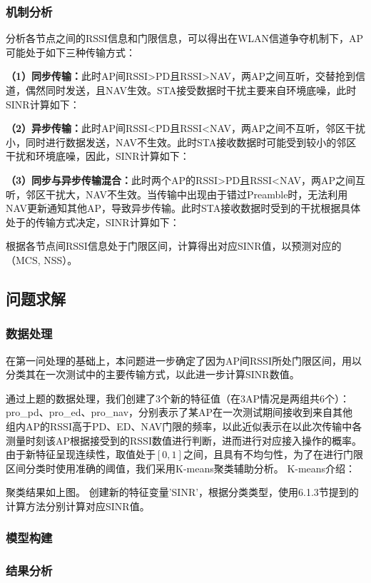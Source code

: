 \documentclass[bwprint]{gmcmthesis}
\begin{document}
\subsubsection{机制分析}
分析各节点之间的RSSI信息和门限信息，可以得出在WLAN信道争夺机制下，AP可能处于如下三种传输方式：

\textbf{（1）同步传输：}此时AP间RSSI>PD且RSSI>NAV，两AP之间互听，交替抢到信道，偶然同时发送，且NAV生效。STA接受数据时干扰主要来自环境底噪，此时SINR计算如下：

\textbf{（2）异步传输：}此时AP间RSSI<PD且RSSI<NAV，两AP之间不互听，邻区干扰小，同时进行数据发送，NAV不生效。此时STA接收数据时可能受到较小的邻区干扰和环境底噪，因此，SINR计算如下：

\textbf{（3）同步与异步传输混合：}此时两个AP的RSSI>PD且RSSI<NAV，两AP之间互听，邻区干扰大，NAV不生效。当传输中出现由于错过Preamble时，无法利用NAV更新通知其他AP，导致异步传输。此时STA接收数据时受到的干扰根据具体处于的传输方式决定，SINR计算如下：

根据各节点间RSSI信息处于门限区间，计算得出对应SINR值，以预测对应的（MCS, NSS）。
\subsection{问题求解}
\subsubsection{数据处理}
在第一问处理的基础上，本问题进一步确定了因为AP间RSSI所处门限区间，用以分类其在一次测试中的主要传输方式，以此进一步计算SINR数值。

通过上题的数据处理，我们创建了3个新的特征值（在3AP情况是两组共6个）：pro\_pd、pro\_ed、pro\_nav，分别表示了某AP在一次测试期间接收到来自其他
组内AP的RSSI高于PD、ED、NAV门限的频率，以此近似表示在以此次传输中各测量时刻该AP根据接受到的RSSI数值进行判断，进而进行对应接入操作的概率。
由于新特征呈现连续性，取值处于$[0,1]$之间，且具有不均匀性，为了在进行门限区间分类时使用准确的阈值，我们采用K-means聚类辅助分析。
K-means介绍：

聚类结果如上图。
创建新的特征变量'SINR'，根据分类类型，使用6.1.3节提到的计算方法分别计算对应SINR值。
\subsubsection{模型构建}
\subsubsection{结果分析}
\end{document}
